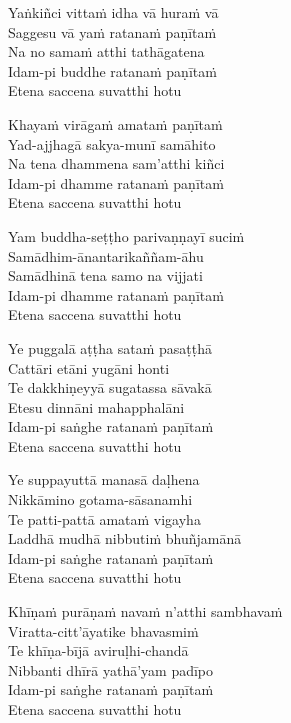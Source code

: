 \begin{paritta}

Yaṅkiñci vittaṁ idha vā huraṁ vā\\
Saggesu vā yaṁ ratanaṁ paṇītaṁ\\
Na no samaṁ atthi tathāgatena\\
Idam-pi buddhe ratanaṁ paṇītaṁ\\
Etena saccena suvatthi hotu

Khayaṁ virāgaṁ amataṁ paṇītaṁ\\
Yad-ajjhagā sakya-munī samāhito\\
Na tena dhammena sam'atthi kiñci\\
Idam-pi dhamme ratanaṁ paṇītaṁ\\
Etena saccena suvatthi hotu

Yam buddha-seṭṭho parivaṇṇayī suciṁ\\
Samādhim-ānantarikaññam-āhu\\
Samādhinā tena samo na vijjati\\
Idam-pi dhamme ratanaṁ paṇītaṁ\\
Etena saccena suvatthi hotu

Ye puggalā aṭṭha sataṁ pasaṭṭhā\\
Cattāri etāni yugāni honti\\
Te dakkhiṇeyyā sugatassa sāvakā\\
Etesu dinnāni mahapphalāni\\
Idam-pi saṅghe ratanaṁ paṇītaṁ\\
Etena saccena suvatthi hotu

\clearpage

Ye suppayuttā manasā daḷhena\\
Nikkāmino gotama-sāsanamhi\\
Te patti-pattā amataṁ vigayha\\
Laddhā mudhā nibbutiṁ bhuñjamānā\\
Idam-pi saṅghe ratanaṁ paṇītaṁ\\
Etena saccena suvatthi hotu

Khīṇaṁ purāṇaṁ navaṁ n'atthi sambhavaṁ\\
Viratta-citt'āyatike bhavasmiṁ\\
Te khīṇa-bījā aviruḷhi-chandā\\
Nibbanti dhīrā yathā'yam padīpo\\
Idam-pi saṅghe ratanaṁ paṇītaṁ\\
Etena saccena suvatthi hotu


\end{paritta}

